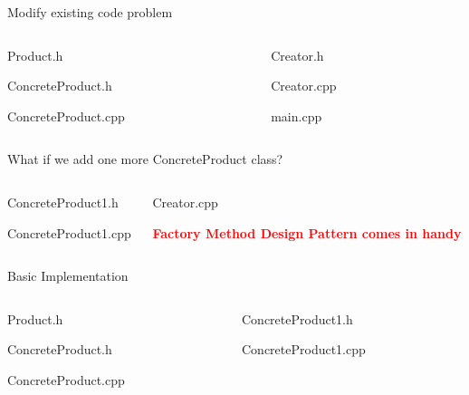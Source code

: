 \documentclass[13pt]{beamer}
\begin{document}
\begin{frame}{Modify existing code problem}
\begin{columns}[T]
\begin{column}{.45\textwidth}
\lstset{basicstyle=\tiny,style=myCustomCppStyle}
Product.h

ConcreteProduct.h

ConcreteProduct.cpp

\end{column}

\begin{column}{.45\textwidth}
\lstset{basicstyle=\tiny,style=myCustomCppStyle}
Creator.h

Creator.cpp

main.cpp

\end{column}
\end{columns}
\end{frame}

\begin{frame}{What if we add one more ConcreteProduct class?}
\begin{columns}[T]
\begin{column}{.45\textwidth}
\lstset{basicstyle=\tiny,style=myCustomCppStyle}
ConcreteProduct1.h

ConcreteProduct1.cpp

\end{column}

\begin{column}{.45\textwidth}
\lstset{basicstyle=\tiny,style=myCustomCppStyle}
Creator.cpp

\textcolor{red}{\textbf{Factory Method Design Pattern comes in handy}}
\end{column}
\end{columns}
\end{frame}

\begin{frame}{Basic Implementation}
\begin{columns}[T]
\begin{column}{.45\textwidth}
\lstset{basicstyle=\tiny,style=myCustomCppStyle}
Product.h

ConcreteProduct.h

ConcreteProduct.cpp

\end{column}

\begin{column}{.45\textwidth}
\lstset{basicstyle=\tiny,style=myCustomCppStyle}
ConcreteProduct1.h

ConcreteProduct1.cpp

\end{column}
\end{columns}
\end{frame}
\end{document}

